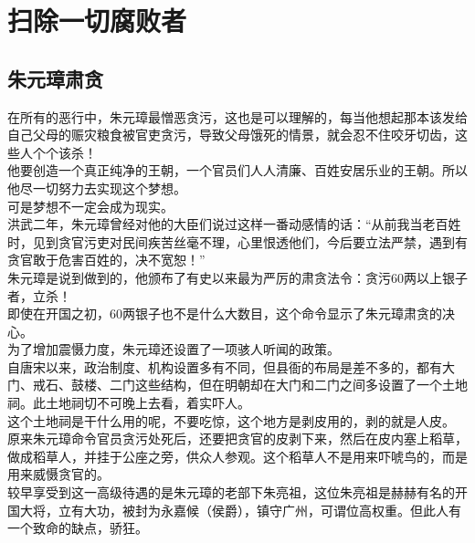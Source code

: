 \section{扫除一切腐败者}
\ifnum{}
	\begin{multicols}{\theparacolNo}
\fi
\subsection{朱元璋肃贪}
在所有的恶行中，朱元璋最憎恶贪污，这也是可以理解的，每当他想起那本该发给自己父母的赈灾粮食被官吏贪污，导致父母饿死的情景，就会忍不住咬牙切齿，这些人个个该杀！\\

他要创造一个真正纯净的王朝，一个官员们人人清廉、百姓安居乐业的王朝。所以他尽一切努力去实现这个梦想。\\

可是梦想不一定会成为现实。\\

洪武二年，朱元璋曾经对他的大臣们说过这样一番动感情的话：“从前我当老百姓时，见到贪官污吏对民间疾苦丝毫不理，心里恨透他们，今后要立法严禁，遇到有贪官敢于危害百姓的，决不宽恕！”\\

朱元璋是说到做到的，他颁布了有史以来最为严厉的肃贪法令：贪污60两以上银子者，立杀！\\

即使在开国之初，60两银子也不是什么大数目，这个命令显示了朱元璋肃贪的决心。\\

为了增加震慑力度，朱元璋还设置了一项骇人听闻的政策。\\

自唐宋以来，政治制度、机构设置多有不同，但县衙的布局是差不多的，都有大门、戒石、鼓楼、二门这些结构，但在明朝却在大门和二门之间多设置了一个土地祠。此土地祠切不可晚上去看，着实吓人。\\

这个土地祠是干什么用的呢，不要吃惊，这个地方是剥皮用的，剥的就是人皮。\\

原来朱元璋命令官员贪污处死后，还要把贪官的皮剥下来，然后在皮内塞上稻草，做成稻草人，并挂于公座之旁，供众人参观。这个稻草人不是用来吓唬鸟的，而是用来威慑贪官的。\\

较早享受到这一高级待遇的是朱元璋的老部下朱亮祖，这位朱亮祖是赫赫有名的开国大将，立有大功，被封为永嘉候（侯爵），镇守广州，可谓位高权重。但此人有一个致命的缺点，骄狂。\\


\end{multicols}
